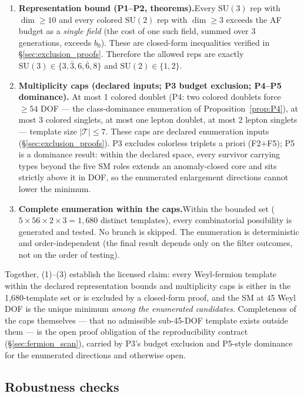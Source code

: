 \documentclass[11pt]{article}
\theoremstyle{definition}
\newcommand{\SU}{\mathrm{SU}}
\begin{document}
\begin{enumerate}[nosep]
\item \textbf{Representation bound (P1--P2, theorems).}\quad Every
$\SU(3)$ rep with $\dim \ge 10$ and every colored $\SU(2)$ rep with
$\dim \ge 3$ exceeds the AF budget as a \emph{single field} (the cost
of one such field, summed over 3 generations, exceeds $b_0$).  These
are closed-form inequalities verified in \S\ref{sec:exclusion_proofs}.
Therefore the allowed reps are exactly
$\SU(3) \in \{3,\bar{3},6,\bar{6},8\}$ and $\SU(2) \in \{1,2\}$.

\item \textbf{Multiplicity caps (declared inputs; P3 budget exclusion; P4--P5 dominance).}\quad
At most 1 colored doublet (P4: two colored doublets force $\ge 54$
DOF --- the class-dominance enumeration of
Proposition~\ref{prop:P4}), at most 3 colored singlets,
at most one lepton doublet, at most 2 lepton singlets --- template size
$|\mathcal{T}| \le 7$.  These caps are declared enumeration inputs
(\S\ref{sec:exclusion_proofs}).  P3 excludes colorless triplets a priori
(F2$+$F5); P5 is a dominance result: within the declared space, every
survivor carrying types beyond the five SM roles extends an
anomaly-closed core and sits strictly above it in DOF, so the
enumerated enlargement directions cannot lower the
minimum.

\item \textbf{Complete enumeration within the caps.}\quad Within the
bounded set ($5 \times 56 \times 2 \times 3 = 1{,}680$ distinct
templates), every combinatorial possibility is generated and tested.
No branch is skipped.  The enumeration is deterministic and
order-independent (the final result depends only on the filter
outcomes, not on the order of testing).
\end{enumerate}

\noindent Together, (1)--(3) establish the licensed claim: every
Weyl-fermion template within the declared representation bounds and
multiplicity caps is either in the 1{,}680-template set or is excluded
by a closed-form proof, and the SM at 45 Weyl DOF is the unique
minimum \emph{among the enumerated candidates}.  Completeness of the
caps themselves --- that no admissible sub-45-DOF template exists
outside them --- is the open proof obligation of the reproducibility
contract (\S\ref{sec:fermion_scan}), carried by P3's budget exclusion and P5-style dominance
for the enumerated directions and otherwise open.

\subsection{Robustness checks}
\label{app:robustness}
\end{document}
